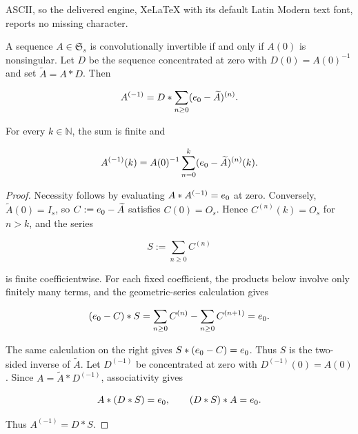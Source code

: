 \documentclass[10pt,a4paper]{amsart}
\newcommand{\N}{\mathbb N}
\newcommand{\ez}{e_{\mathstrut 0}}
\begin{document}
ASCII, so the delivered engine, XeLaTeX with its default Latin Modern text font, reports no missing character.
\begin{theorem}\label{thm:inverse}
A sequence $A\in\mathfrak S_s$ is convolutionally invertible if and only if $A(0)$ is nonsingular. Let $D$ be the sequence concentrated at zero with $D(0)=A(0)^{-1}$ and set $\widetilde A=A*D$. Then

\begin{equation}\label{eq:inverse-neumann}
A^{(-1)}
=
D*\sum_{n\geq0}(\ez-\widetilde A)^{(n)}.
\end{equation}

For every $k\in\N$, the sum is finite and

\begin{equation}\label{eq:inverse-coefficient}
A^{(-1)}(k)
=
A(0)^{-1}\sum_{n=0}^{k}(\ez-\widetilde A)^{(n)}(k).
\end{equation}

\end{theorem}

\begin{proof}
Necessity follows by evaluating $A*A^{(-1)}=\ez$ at zero. Conversely, $\widetilde A(0)=I_s$, so $C:=\ez-\widetilde A$ satisfies $C(0)=O_s$. Hence $C^{(n)}(k)=O_s$ for $n>k$, and the series

\begin{equation*}
S:=\sum_{n\geq0}C^{(n)}
\end{equation*}

is finite coefficientwise. For each fixed coefficient, the products below involve only finitely many terms, and the geometric-series calculation gives

\begin{equation*}
(\ez-C)*S
=
\sum_{n\geq0}C^{(n)}-\sum_{n\geq0}C^{(n+1)}
=
\ez.
\end{equation*}

The same calculation on the right gives $S*(\ez-C)=\ez$. Thus $S$ is the two-sided inverse of $\widetilde A$. Let $D^{(-1)}$ be concentrated at zero with $D^{(-1)}(0)=A(0)$. Since $A=\widetilde A*D^{(-1)}$, associativity gives

\begin{equation*}
A*(D*S)=\ez,
\qquad
(D*S)*A=\ez.
\end{equation*}

Thus $A^{(-1)}=D*S$.
\end{proof}
\end{document}
